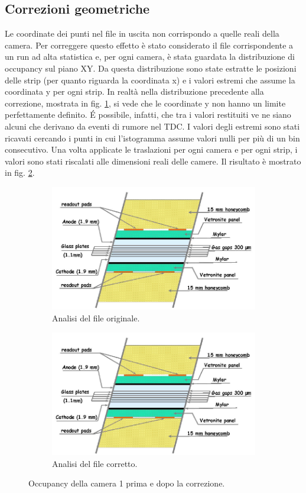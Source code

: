 \documentclass[8pt]{extarticle}
\begin{document}
\subsection{Correzioni geometriche}
Le coordinate dei punti nel file in uscita non corrispondo a quelle reali della camera. Per correggere questo effetto è stato considerato il file corrispondente a un run ad alta statistica e, per ogni camera, è stata guardata la distribuzione di occupancy sul piano XY. Da questa distribuzione sono state estratte le posizioni delle strip (per quanto riguarda la coordinata x) e i valori estremi che assume la coordinata y per ogni strip. In realtà nella distribuzione precedente alla correzione, mostrata in fig. \ref{fig:disxy1_prima}, si vede che le coordinate y non hanno un limite perfettamente definito. \'E possibile, infatti, che tra i valori restituiti ve ne siano alcuni che derivano da eventi di rumore nel TDC. I valori degli estremi sono stati ricavati cercando i punti in cui l'istogramma assume valori nulli per più di un bin consecutivo. Una volta applicate le traslazioni per ogni camera e per ogni strip, i valori sono stati riscalati alle dimensioni reali delle camere. Il risultato è mostrato in fig. \ref{fig:disxy1_dopo}.

\begin{figure}
\centering
\begin{subfigure}{.5\textwidth}
  \centering
  \includegraphics[width=.6\linewidth]{mrpc}
  \caption{Analisi del file originale.}
  \label{fig:disxy1_prima}
\end{subfigure}%
\begin{subfigure}{.5\textwidth}
  \centering
  \includegraphics[width=.6\linewidth]{mrpc}
  \caption{Analisi del file corretto.}
  \label{fig:disxy1_dopo}
\end{subfigure}
\caption{Occupancy della camera 1 prima e dopo la correzione.}
\label{fig:disxy1}
\end{figure}
\end{document}

